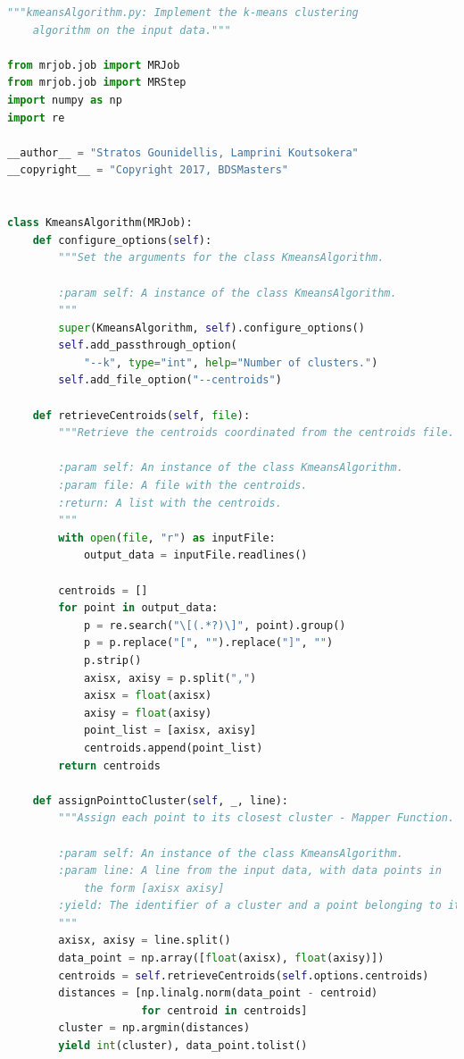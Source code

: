 \documentclass[11pt]{article}
\begin{document}
\begin{lstlisting}[language=Python]
"""kmeansAlgorithm.py: Implement the k-means clustering
    algorithm on the input data."""

from mrjob.job import MRJob
from mrjob.job import MRStep
import numpy as np
import re

__author__ = "Stratos Gounidellis, Lamprini Koutsokera"
__copyright__ = "Copyright 2017, BDSMasters"


class KmeansAlgorithm(MRJob):
    def configure_options(self):
        """Set the arguments for the class KmeansAlgorithm.

        :param self: A instance of the class KmeansAlgorithm.
        """
        super(KmeansAlgorithm, self).configure_options()
        self.add_passthrough_option(
            "--k", type="int", help="Number of clusters.")
        self.add_file_option("--centroids")

    def retrieveCentroids(self, file):
        """Retrieve the centroids coordinated from the centroids file.

        :param self: An instance of the class KmeansAlgorithm.
        :param file: A file with the centroids.
        :return: A list with the centroids.
        """
        with open(file, "r") as inputFile:
            output_data = inputFile.readlines()

        centroids = []
        for point in output_data:
            p = re.search("\[(.*?)\]", point).group()
            p = p.replace("[", "").replace("]", "")
            p.strip()
            axisx, axisy = p.split(",")
            axisx = float(axisx)
            axisy = float(axisy)
            point_list = [axisx, axisy]
            centroids.append(point_list)
        return centroids

    def assignPointtoCluster(self, _, line):
        """Assign each point to its closest cluster - Mapper Function.

        :param self: An instance of the class KmeansAlgorithm.
        :param line: A line from the input data, with data points in
            the form [axisx axisy]
        :yield: The identifier of a cluster and a point belonging to it.
        """
        axisx, axisy = line.split()
        data_point = np.array([float(axisx), float(axisy)])
        centroids = self.retrieveCentroids(self.options.centroids)
        distances = [np.linalg.norm(data_point - centroid)
                     for centroid in centroids]
        cluster = np.argmin(distances)
        yield int(cluster), data_point.tolist()


\end{lstlisting}
\end{document}
